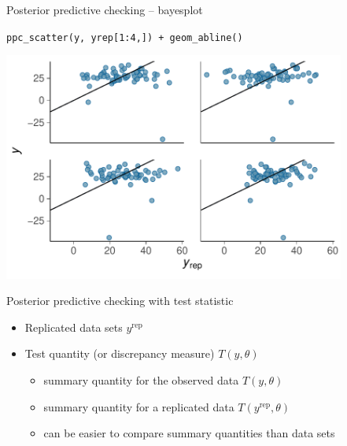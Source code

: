 \documentclass[t]{beamer}
\DeclareMathOperator{\rep}{\mathrm{rep}}
\begin{document}
\begin{frame}{Posterior predictive checking -- bayesplot}

  \vspace{-1\baselineskip}
  \texttt{ppc\_scatter(y, yrep[1:4,]) + geom\_abline()}
  
  \includegraphics[height=7.5cm]{Newcomb_ppc_scatter.pdf}

\end{frame}

\begin{frame}{Posterior predictive checking with test statistic}

  \begin{itemize}
  \item Replicated data sets $y^{\rep}$
  \item Test quantity (or discrepancy measure) $T(y,\theta)$
    \begin{itemize}
    \item summary quantity for the observed data $T(y,\theta)$
    \item summary quantity for a replicated data $T(y^{\rep},\theta)$
    \item can be easier to compare summary quantities than data sets
    \end{itemize}
  \end{itemize}

\end{frame}
\end{document}
